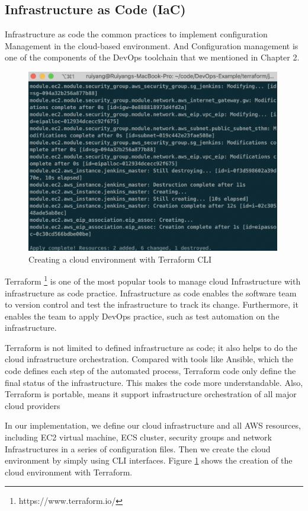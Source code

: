 \subsection{Infrastructure as Code (IaC)}
Infrastructure as code the common practices to implement configuration Management in the cloud-based environment. And Configuration management is one of the components of the DevOps toolchain that we mentioned in Chapter 2.
\begin{figure}[h]
\centering
\includegraphics[width=0.99\textwidth]{pics/terraform.png}
\caption{Creating a cloud environment with Terraform CLI}
\label{fig:terraform}
\end{figure}
\par
Terraform \footnote{https://www.terraform.io/} is one of the most popular tools to manage cloud Infrastructure with infrastructure as code practice. Infrastructure as code enables the software team to version control and test the infrastructure to track its change. Furthermore, it enables the team to apply DevOps practice, such as test automation on the infrastructure.

Terraform is not limited to defined infrastructure as code; it also helps to do the cloud infrastructure orchestration. Compared with tools like Ansible, which the code defines each step of the automated process, Terraform code only define the final status of the infrastructure. This makes the code more understandable. Also, Terraform is portable, means it support infrastructure orchestration of all major cloud providers

In our implementation, we define our cloud infrastructure and all AWS resources, including EC2 virtual machine, ECS cluster, security groups and network Infrastructures in a series of configuration files. Then we create the cloud environment by simply using CLI interfaces. Figure \ref{fig:terraform} shows the creation of the cloud environment with Terraform.
